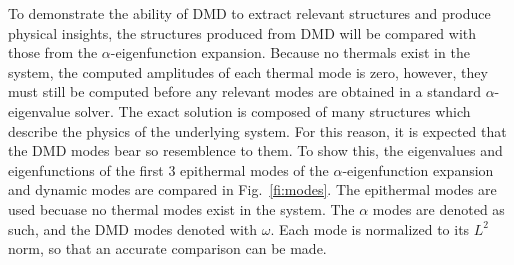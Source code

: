 \documentclass[12pt]{article}
\newcommand{\FI}[1]{Fig.~\ref{fi:#1}}
\begin{document}
To demonstrate the ability of DMD to extract relevant structures and produce
	physical insights, the structures produced from DMD will be compared with 
	those from the $\alpha$-eigenfunction expansion.
Because no thermals exist in the system, the computed amplitudes of each 
	thermal mode is zero, however, they must still be computed before any 
	relevant modes are obtained in a standard $\alpha$-eigenvalue solver. 
The exact solution is composed of many structures which describe the physics of
	the underlying system. 
For this reason, it is expected that the DMD modes bear so resemblence to them.
To show this, the eigenvalues and eigenfunctions of the first 3 epithermal 
	modes of the $\alpha$-eigenfunction expansion and dynamic modes are compared 
	in \FI{modes}.
The epithermal modes are used becuase no thermal modes exist in the system.
The $\alpha$ modes are denoted as such, and the DMD modes denoted with $\omega$.
Each mode is normalized to its $L^2$ norm, so that an accurate comparison can 
	be made.
	
\end{document}
